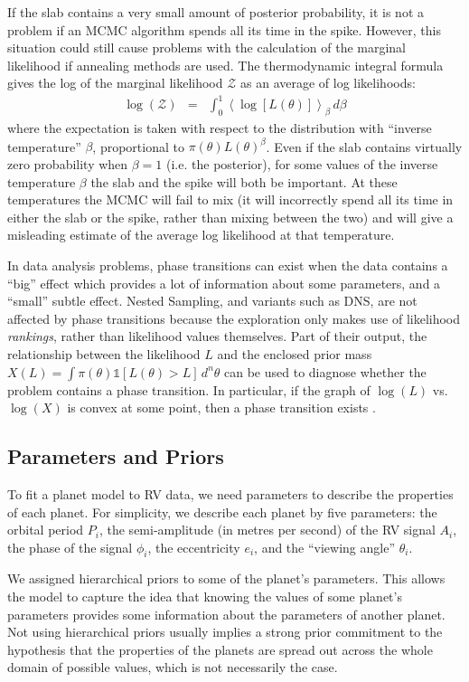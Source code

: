 \documentclass[useAMS,usenatbib]{mn2e}
\begin{document}
If the slab contains a very small amount of posterior probability, it is not
a problem if an MCMC algorithm spends all its time in the spike. However, this
situation could still cause problems with the calculation of the marginal likelihood
if annealing methods are used. The thermodynamic integral formula gives
the log of the marginal likelihood $\mathcal{Z}$ as an average of log likelihoods:
\begin{eqnarray}
\log(\mathcal{Z}) &=& \int_0^1 \left<\log\left[L(\theta)\right]\right>_\beta \, d\beta
\end{eqnarray}
where the expectation is taken with respect to the
distribution with ``inverse temperature'' $\beta$, proportional to
$\pi(\theta)L(\theta)^\beta$. Even if the slab contains virtually zero probability
when $\beta=1$ (i.e. the posterior), for some values of the inverse temperature
$\beta$ the slab and the spike will both be important. At
these temperatures the MCMC will fail to mix (it will incorrectly spend all its
time in either the slab or the spike, rather than mixing between the two)
and will give a misleading estimate of the average log likelihood at that temperature.

In data analysis problems, phase transitions can exist when the data contains
a ``big'' effect which provides a lot of information about some parameters, and
a ``small'' subtle effect.
Nested Sampling, and variants such as DNS, are not affected
by phase transitions because the exploration only makes use of likelihood
{\it rankings}, rather than likelihood values themselves.
Part of their output, the relationship between the
likelihood $L$ and the enclosed prior mass
$X(L) = \int \pi(\theta) \mathds{1}\left[L(\theta) > L\right]\, d^n\theta$
can be used to diagnose whether the
problem contains a phase transition. In particular, if the graph of $\log(L)$
vs. $\log(X)$ is convex at some point, then a phase transition exists
\citep{skilling}.

\subsection{Parameters and Priors}
To fit a planet model to RV data, we need parameters to describe
the properties of each planet. For simplicity, we describe each planet by
five parameters: the orbital period $P_i$, the semi-amplitude (in metres
per second) of the RV signal $A_i$, the phase of the signal
$\phi_i$, the eccentricity $e_i$, and the ``viewing angle'' $\theta_i$.

We assigned hierarchical priors to some of the planet's parameters. This allows the
model to capture the idea that knowing the values of some planet's parameters
provides some information about the parameters of another planet. Not using
hierarchical priors usually implies a strong prior commitment to the hypothesis
that the properties of the planets are spread out across the whole domain of
possible values, which is not necessarily the case.
\end{document}
